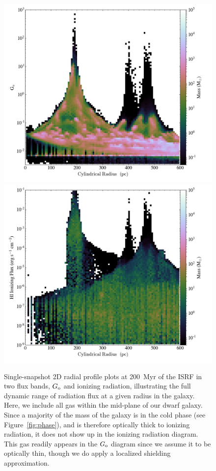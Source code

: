 \documentclass[twocolumn]{aastex61}
\begin{document}
\begin{figure}
\centering
\includegraphics[width=0.45\linewidth]{g_o_2D_phase}
\includegraphics[width=0.45\linewidth]{q_o_2D_phase}
\caption{Single-snapshot 2D radial profile plots at 200~Myr of the ISRF in two flux bands, $G_{\rm o}$ and  ionizing radiation, illustrating the full dynamic range of radiation flux at a given radius in the galaxy. Here, we include all gas within the mid-plane of our dwarf galaxy. Since a majority of the mass of the galaxy is in the cold phase (see Figure~\ref{fig:phase}), and is therefore optically thick to  ionizing radiation, it does not show up in the  ionizing radiation diagram. This gas readily appears in the $G_{\rm o}$ diagram since we assume it to be optically thin, though we do apply a localized shielding approximation.}
\label{fig:ISRF_2D}
\end{figure}
\end{document}
